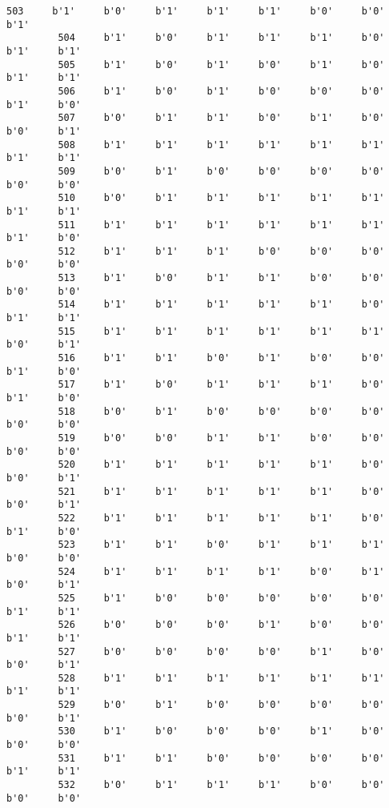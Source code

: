 \documentclass[11pt]{article}
\begin{document}
\begin{Verbatim}[commandchars=\\\{\}]
         503     b'1'     b'0'     b'1'     b'1'     b'1'     b'0'     b'0'     b'1'   
         504     b'1'     b'0'     b'1'     b'1'     b'1'     b'0'     b'1'     b'1'   
         505     b'1'     b'0'     b'1'     b'0'     b'1'     b'0'     b'1'     b'1'   
         506     b'1'     b'0'     b'1'     b'0'     b'0'     b'0'     b'1'     b'0'   
         507     b'0'     b'1'     b'1'     b'0'     b'1'     b'0'     b'0'     b'1'   
         508     b'1'     b'1'     b'1'     b'1'     b'1'     b'1'     b'1'     b'1'   
         509     b'0'     b'1'     b'0'     b'0'     b'0'     b'0'     b'0'     b'0'   
         510     b'0'     b'1'     b'1'     b'1'     b'1'     b'1'     b'1'     b'1'   
         511     b'1'     b'1'     b'1'     b'1'     b'1'     b'1'     b'1'     b'0'   
         512     b'1'     b'1'     b'1'     b'0'     b'0'     b'0'     b'0'     b'0'   
         513     b'1'     b'0'     b'1'     b'1'     b'0'     b'0'     b'0'     b'0'   
         514     b'1'     b'1'     b'1'     b'1'     b'1'     b'0'     b'1'     b'1'   
         515     b'1'     b'1'     b'1'     b'1'     b'1'     b'1'     b'0'     b'1'   
         516     b'1'     b'1'     b'0'     b'1'     b'0'     b'0'     b'1'     b'0'   
         517     b'1'     b'0'     b'1'     b'1'     b'1'     b'0'     b'1'     b'0'   
         518     b'0'     b'1'     b'0'     b'0'     b'0'     b'0'     b'0'     b'0'   
         519     b'0'     b'0'     b'1'     b'1'     b'0'     b'0'     b'0'     b'0'   
         520     b'1'     b'1'     b'1'     b'1'     b'1'     b'0'     b'0'     b'1'   
         521     b'1'     b'1'     b'1'     b'1'     b'1'     b'0'     b'0'     b'1'   
         522     b'1'     b'1'     b'1'     b'1'     b'1'     b'0'     b'1'     b'0'   
         523     b'1'     b'1'     b'0'     b'1'     b'1'     b'1'     b'0'     b'0'   
         524     b'1'     b'1'     b'1'     b'1'     b'0'     b'1'     b'0'     b'1'   
         525     b'1'     b'0'     b'0'     b'0'     b'0'     b'0'     b'1'     b'1'   
         526     b'0'     b'0'     b'0'     b'1'     b'0'     b'0'     b'1'     b'1'   
         527     b'0'     b'0'     b'0'     b'0'     b'1'     b'0'     b'0'     b'1'   
         528     b'1'     b'1'     b'1'     b'1'     b'1'     b'1'     b'1'     b'1'   
         529     b'0'     b'1'     b'0'     b'0'     b'0'     b'0'     b'0'     b'1'   
         530     b'1'     b'0'     b'0'     b'0'     b'1'     b'0'     b'0'     b'0'   
         531     b'1'     b'1'     b'0'     b'0'     b'0'     b'0'     b'1'     b'1'   
         532     b'0'     b'1'     b'1'     b'1'     b'0'     b'0'     b'0'     b'0'   

\end{Verbatim}
\end{document}
